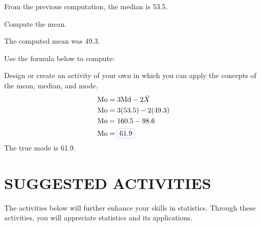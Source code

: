 \begin{example}
\begin{myenumerate}
\begin{description}
From the previous computation, the median is 53.5.

\item[Step 2.] Compute the mean.

The computed mean was 49.3.

\item[Step 3.] Use the formula below to compute:

\item Design or create an activity of your own in which you can apply the concepts of the mean,
median, and mode.
\begin{align*}
\Mo & = 3 \Md - 2 \bar{X}\\
\Mo & = 3 (53.5) - 2 (49.3)\\
\Mo & = 160.5 - 98.6\\
\Mo & = \boxed{61.9}
\end{align*}
The true mode is 61.9.
\end{description}
\end{myenumerate}
\end{example}

\section*{SUGGESTED ACTIVITIES}
The activities below will further enhance your skills in statistics.
Through these activities, you will appreciate statistics and its applications.

